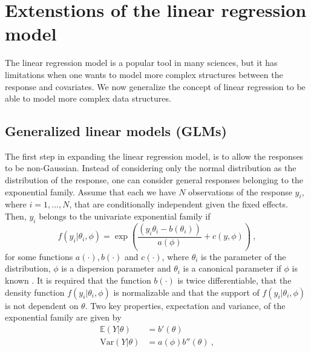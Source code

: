 \section{Extenstions of the linear regression model}
The linear regression model is a popular tool in many sciences, but it has limitations when one wants to model more complex structures between the response and covariates. We now generalize the concept of linear regression to be able to model more complex data structures.
\subsection{Generalized linear models (GLMs)}
\label{sec:GLM}
The first step in expanding the linear regression model, is to allow the responses to be non-Gaussian. 
Instead of considering only the normal distribution as the distribution of the response, one can consider general responses belonging to the exponential family.
Assume that each we have $N$ observations of the response $y_{i}$, where $i=1, ..., N$, that are conditionally independent given the fixed effects.
Then, $y_{i}$ belongs to the univariate exponential family if
\begin{equation}
    \label{eq:exp_family}
    f(y_{i} \lvert \theta_{i}, \phi) = \exp\left(\frac{(y_{i}\theta_{i} - b(\theta_{i}))}{a(\phi)} + c(y, \phi) \right) \ ,
\end{equation}
for some functions $a(\cdot), b(\cdot)$ and $c(\cdot)$, where $\theta_{i}$ is the parameter of the distribution, $\phi$ is a dispersion parameter and $\theta_{i}$ is a canonical parameter if $\phi$ is known \citep{GLMM_book_old}. 
It is required that the function $b(\cdot)$ is twice differentiable, that the density function $f(y_{i} \lvert \theta_{i}, \phi)$ is normalizable and that the support of $f(y_{i} \lvert \theta_{i}, \phi)$ is not dependent on $\theta$.
Two key properties, expectation and variance, of the exponential family are given by
\begin{equation}
    \begin{aligned}
        \mathbb{E}(Y \lvert \theta) &= b'(\theta) \\
        \text{Var}(Y \lvert \theta) &= a(\phi) b''(\theta) \ ,
    \end{aligned}
\end{equation}
